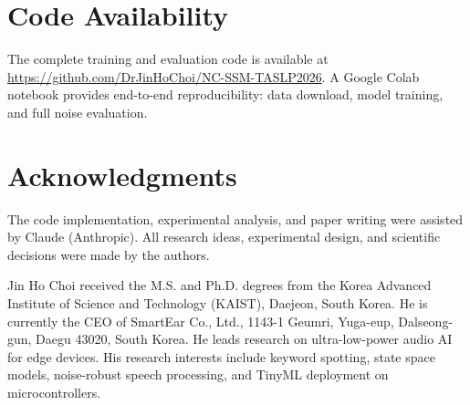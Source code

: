 \documentclass[journal]{IEEEtran}
\begin{document}
\section*{Code Availability}
The complete training and evaluation code is available at \url{https://github.com/DrJinHoChoi/NC-SSM-TASLP2026}.
A Google Colab notebook provides end-to-end reproducibility: data download, model training, and full noise evaluation.

\section*{Acknowledgments}
The code implementation, experimental analysis, and paper writing were assisted by Claude (Anthropic).
All research ideas, experimental design, and scientific decisions were made by the authors.





\begin{IEEEbiography}[]{Jin Ho Choi}
received the M.S. and Ph.D. degrees from the Korea Advanced Institute of Science and Technology (KAIST), Daejeon, South Korea.
He is currently the CEO of SmartEar Co., Ltd., 1143-1 Geumri, Yuga-eup, Dalseong-gun, Daegu 43020, South Korea.
He leads research on ultra-low-power audio AI for edge devices.
His research interests include keyword spotting, state space models, noise-robust speech processing, and TinyML deployment on microcontrollers.
\end{IEEEbiography}
\end{document}
